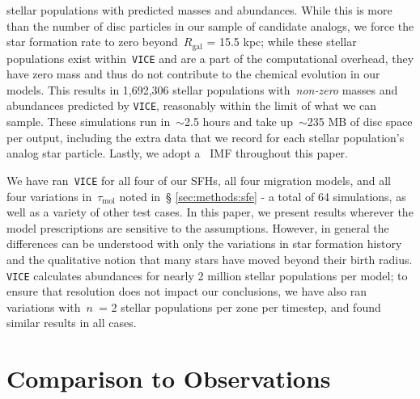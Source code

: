 \documentclass[fleqn, usenatbib]{mnras}
\begin{document}
stellar populations with predicted masses and abundances. While this is more 
than the number of disc particles in our sample of candidate analogs, we force 
the star formation rate to zero beyond~$R_\text{gal}$ = 15.5 kpc; while these 
stellar populations exist within~\texttt{VICE} and are a part of the 
computational overhead, they have zero mass and thus do not contribute to the 
chemical evolution in our models. This results in 1,692,306 stellar 
populations with~\textit{non-zero} masses and abundances predicted by 
\texttt{VICE}, reasonably within the limit of what we can sample. These 
simulations run in~$\sim$2.5 hours and take up~$\sim$235 MB of disc space per 
output, including the extra data that we record for each stellar population's 
analog star particle. Lastly, we adopt a~\citet{Kroupa2001} IMF throughout this 
paper. 
\par 
We have ran~\texttt{VICE} for all four of our SFHs, all four migration 
models, and all four variations in~$\tau_\text{mol}$ noted in~\S 
\ref{sec:methods:sfe} - a total of 64 simulations, as well as a variety of 
other test cases. In this paper, we present results wherever the model 
prescriptions are sensitive to the assumptions. However, in general the 
differences can be understood with only the variations in star formation 
history and the qualitative notion that many stars have moved beyond their 
birth radius. \texttt{VICE} calculates abundances for nearly 2 million stellar 
populations per model; to ensure that resolution does not impact our 
conclusions, we have also ran variations with~$n$~= 2 stellar populations per 
zone per timestep, and found similar results in all cases. 

\section{Comparison to Observations} 
\label{sec:obs_comp} 
\end{document}
